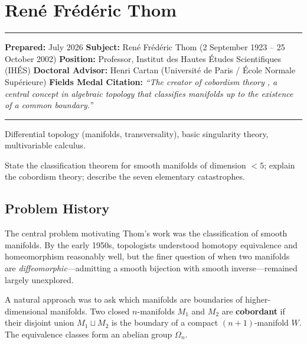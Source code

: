 \chapter{René Frédéric Thom}\label{ch1958renethom:renuxe9-fruxe9duxe9ric-thom-fields-medal-1958-a-comprehensive-report}

\begin{center}\rule{0.5\linewidth}{0.5pt}\end{center}

\textbf{Prepared:} July 2026
\textbf{Subject:} René Frédéric Thom (2 September 1923 -- 25 October 2002)
\textbf{Position:} Professor, Institut des Hautes Études Scientifiques (IHÉS)
\textbf{Doctoral Advisor:} Henri Cartan (Université de Paris / École Normale Supérieure)
\textbf{Fields Medal Citation:} \emph{``The creator of cobordism theory \cite{thom1954}, a central
concept in algebraic topology that classifies manifolds up to the existence of a
common boundary.''}

\begin{center}\rule{0.5\linewidth}{0.5pt}\end{center}

\begin{prereqs} Differential topology (manifolds, transversality),
basic singularity theory, multivariable calculus. \end{prereqs}

\begin{objectives} State the classification theorem for smooth manifolds
of dimension $< 5$; explain the cobordism theory; describe the seven
elementary catastrophes. \end{objectives}

\section{Problem History}

The central problem motivating Thom's work was the classification of smooth
manifolds. By the early 1950s, topologists understood homotopy equivalence and
homeomorphism reasonably well, but the finer question of when two manifolds are
\emph{diffeomorphic}---admitting a smooth bijection with smooth
inverse---remained largely unexplored.

A natural approach was to ask which manifolds are boundaries of higher-dimensional
manifolds. Two closed $n$-manifolds $M_1$ and $M_2$ are \textbf{cobordant} if
their disjoint union $M_1 \sqcup M_2$ is the boundary of a compact
$(n+1)$-manifold $W$. The equivalence classes form an abelian group $\Omega_n$.

